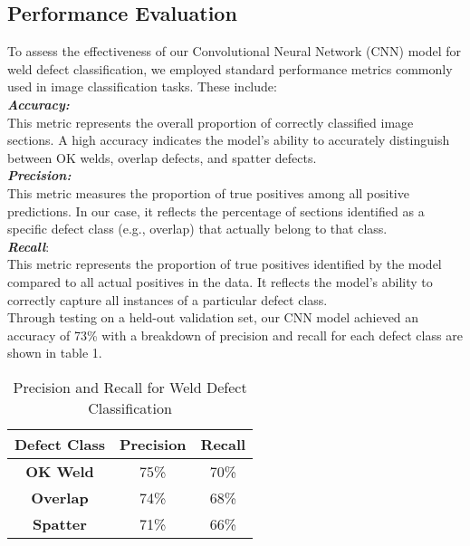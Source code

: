 \documentclass{article_saj}
\begin{document}
\subsection{Performance Evaluation}
\indent
\indent To assess the effectiveness of our Convolutional Neural Network (CNN) model for weld defect classification, we employed standard performance metrics commonly used in image classification tasks. These include:\\

    \indent \textbf{\textit{Accuracy:}}\\ \indent This metric represents the overall proportion of correctly classified image sections. A high accuracy indicates the model's ability to accurately distinguish between OK welds, overlap defects, and spatter defects.\\
    
    \indent \textbf{\textit{Precision:}} \\ \indent This metric measures the proportion of true positives among all positive predictions. In our case, it reflects the percentage of sections identified as a specific defect class (e.g., overlap) that actually belong to that class.\\
    
    \indent \textbf{\textit{Recall}}:\\ \indent This metric represents the proportion of true positives identified by the model compared to all actual positives in the data. It reflects the model's ability to correctly capture all instances of a particular defect class.\\

Through testing on a held-out validation set, our CNN model achieved an accuracy of 73\% with a breakdown of precision and recall for each defect class are shown in table 1.\\

\begin{table}[h]
\centering
\begin{tabular}{|c|c|c|}
\hline
\textbf{Defect Class} & \textbf{Precision} & \textbf{Recall} \\
\hline
\textbf{OK Weld} & 75\% & 70\% \\
\textbf{Overlap} & 74\% & 68\% \\
\textbf{Spatter} & 71\% & 66\% \\
\hline
\end{tabular}
\caption{Precision and Recall for Weld Defect Classification}
\label{tab:performance}
\end{table}
\end{document}
